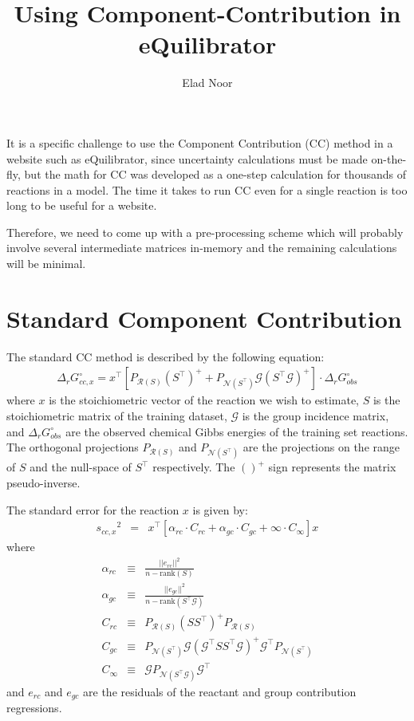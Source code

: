 \documentclass[11pt]{article}
\title{Using Component-Contribution in eQuilibrator}
\author{Elad Noor}
\newcommand{\Gmat}{\mathcal{G}}
\newcommand{\PRmat}[1]{P_{\mathcal{R}\left(#1\right)}}
\newcommand{\PNmat}[1]{P_{\mathcal{N}\left(#1\right)}}
\begin{document}
\maketitle

It is a specific challenge to use the Component Contribution (CC) method in a website such as eQuilibrator, since uncertainty calculations must be made on-the-fly, but the math for CC was developed as a one-step calculation for thousands of reactions in a model. The time it takes to run CC even for a single reaction is too long to be useful for a website.

Therefore, we need to come up with a pre-processing scheme which will probably involve several intermediate matrices in-memory and the remaining calculations will be minimal.

\section{Standard Component Contribution}
The standard CC method is described by the following equation:
\begin{eqnarray}\label{eq:cc}
\Delta_{r}G_{cc,x}^{\circ} = x^{\top} 
\left[ 
	\PRmat{S} \left(S^{\top}\right)^{+} +
	\PNmat{S^\top} \Gmat \left(S^{\top}\Gmat\right)^{+}
\right]
\cdot\Delta_{r}G_{obs}^{\circ}
\end{eqnarray}
where $x$ is the stoichiometric vector of the reaction we wish to estimate, $S$ is the stoichiometric matrix of the training dataset, $\Gmat$ is the group incidence matrix, and $\Delta_{r}G_{obs}^{\circ}$ are the observed chemical Gibbs energies of the training set reactions. The orthogonal projections $P_{\mathcal{R}\left(S\right)}$ and $P_{\mathcal{N}(S^{\top})}$ are the projections on the range of $S$ and the null-space of $S^\top$ respectively. The $()^{+}$ sign represents the matrix pseudo-inverse.

The standard error for the reaction $x$ is given by:
\begin{eqnarray}
{s_{cc,x}}^2 &=& x^{\top} \left[ \alpha_{rc}\cdot C_{rc} + \alpha_{gc}\cdot C_{gc} + \infty\cdot C_{\infty}  \right] x\label{eq:simple_u}
\end{eqnarray}
where
\begin{eqnarray}\label{eq:c_rc}
\alpha_{rc} &\equiv& \frac{||e_{rc}||^{2}}{n-\mbox{rank}(S)} \\
\alpha_{gc} &\equiv& \frac{||e_{gc}||^{2}}{n-\mbox{rank}(S^{\top}\Gmat)} \\
C_{rc} & \equiv & \PRmat{S} \left(SS^{\top}\right)^{+} \PRmat{S} \\
C_{gc} & \equiv & \PNmat{S^\top} \Gmat \left(\Gmat^{\top}SS^{\top}\Gmat\right)^{+} \Gmat^{\top} \PNmat{S^\top} \\
C_{\infty} & \equiv & \Gmat \PNmat{S^\top\Gmat} \Gmat^{\top}
\end{eqnarray}
and $e_{rc}$ and $e_{gc}$ are the residuals of the reactant and group contribution regressions.
\end{document}
